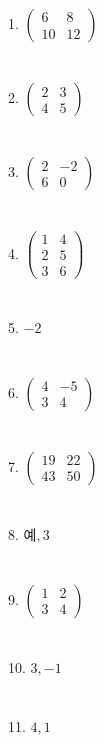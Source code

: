 \documentclass[fleqn]{article}
\begin{document}
1. \(\begin{pmatrix} 6 & 8 \\ 10 & 12 \end{pmatrix}\)\\\\\\
2. \(\begin{pmatrix} 2 & 3 \\ 4 & 5 \end{pmatrix}\)\\\\\\
3. \(\begin{pmatrix} 2 & -2 \\ 6 & 0 \end{pmatrix}\)\\\\\\
4. \(\begin{pmatrix} 1 & 4 \\ 2 & 5 \\ 3 & 6 \end{pmatrix}\)\\\\\\
5. \(-2\)\\\\\\
6. \(\begin{pmatrix} 4 & -5 \\ 3 & 4 \end{pmatrix}\)\\\\\\
7. \(\begin{pmatrix} 19 & 22 \\ 43 & 50 \end{pmatrix}\)\\\\\\
8. \(예, 3\)\\\\\\
9. \(\begin{pmatrix} 1 & 2 \\ 3 & 4 \end{pmatrix}\)\\\\\\
10. \(3, -1\)\\\\\\
11. \(4, 1\)\\\\\\
\end{document}

